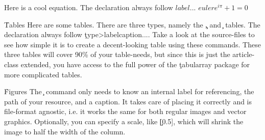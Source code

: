 \documentclass[article,twocolumn]{lix}
\begin{document}
Here is a cool equation. The declaration always follow \c{\begin{math}{label} ... \end{math}}
\begin{math}{euler}
    e^{i\pi}+1=0
\end{math}

\h{Tables}
Here are some tables. There are three types, namely the \c{\cols, \rows} and \c{\grid} tables. The declaration always follow \c{\<type>{label}{caption}{...}}. Take a look at the source-files to see how simple it is to create a decent-looking table using these commands. These three tables will cover 90\% of your table-needs, but since this is just the article-class extended, you have access to the full power of the \c{tabularray}\cite{tabularray} package for more complicated tables.




\h{Figures}
The \c{} command only needs to know an internal label for referencing, the path of your resource, and a caption. It takes care of placing it correctly and is file-format agnostic, i.e. it works the same for both regular images and vector graphics. Optionally, you can specify a scale, like \c{[0.5]}, which will shrink the image to half the width of the column.

\end{document}

